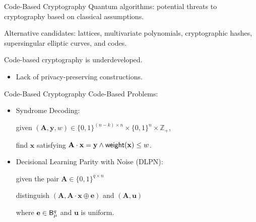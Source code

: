 \begin{frame}{Code-Based Cryptography}
	Quantum algorithms: potential threats to cryptography based on classical assumptions.\pause
	
	Alternative candidates: lattices, multivariate polynomials, cryptographic hashes, supersingular elliptic curves, and codes. \pause

	Code-based cryptography is underdeveloped.\pause
	\begin{itemize}
		\item Lack of privacy-preserving constructions.
	\end{itemize}
\end{frame}

\begin{frame}{Code-Based Cryptography}
	Code-Based Problems:\pause
	\begin{itemize}
		\item Syndrome Decoding: \pause
		
		given $(\mathbf{A}, \mathbf{y}, w) \in \{0,1\}^{(n - k)\times n}\times \{0,1\}^n\times \mathbb{Z}_+$,\pause
		
		find $\mathbf{x}$ satisfying $\mathbf{A}\cdot\mathbf{x} = \mathbf{y} \wedge \mathsf{weight}(\mathbf{x}) \leq w$.\pause
		
		\item Decisional Learning Parity with Noise (DLPN):\pause
		
		given the pair $\mathbf{A} \in \{0,1\}^{q\times n}$\pause
		
		distinguish $(\mathbf{A}, \mathbf{A}\cdot\mathbf{x}\oplus \mathbf{e})$ and $(\mathbf{A}, \mathbf{u})$ 
		
		where $\mathbf{e} \in \mathsf{B}_\mu^q$ and $\mathbf{u}$ is uniform.
	\end{itemize}
\end{frame}